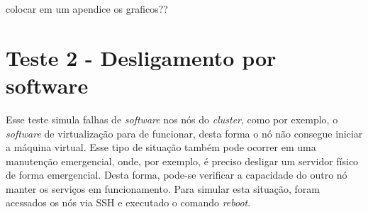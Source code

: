 
colocar em um apendice os graficos??
% 


\section{Teste 2 - Desligamento por software}

Esse teste simula falhas de \textit{software} nos nós do \textit{cluster}, como por exemplo, o \textit{software} de virtualização para de funcionar,
desta forma o nó não consegue iniciar a máquina virtual. Esse tipo de situação também pode ocorrer em uma manutenção emergencial, onde, 
por exemplo, é preciso desligar um servidor físico de forma emergencial. Desta forma, pode-se verificar a capacidade do outro nó manter os serviços
em funcionamento. Para simular esta situação, foram acessados os nós via \ac{SSH} e executado o comando \textit{reboot}.


